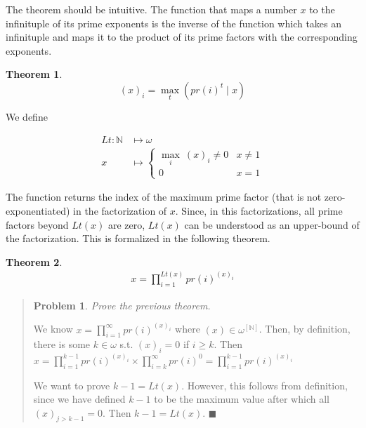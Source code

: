 \documentclass[a4paper, 12pt]{article}
\newtheorem{problem}{Problem}
\newtheorem{theorem}{Theorem}
\newtheorem{problem}{Problem}
\newtheorem{theorem}{Theorem}
\begin{document}
The theorem should be intuitive. The function that maps a number $x$ to the
infinituple of its prime exponents is the inverse of the function which takes an
infinituple and maps it to the product of its prime factors with the
corresponding exponents.

\begin{theorem}
    $$(x)_i = \max_{t} \left( pr(i)^{t} \mid x \right) $$
\end{theorem}

We define 

\begin{align*}
    Lt : \mathbb{N} &\mapsto \omega \\ 
    x &\mapsto \begin{cases}
        \max_{i} ~ (x)_i \neq 0 & x \neq 1 \\ 
        0 & x = 1
    \end{cases}
\end{align*}

The function returns the index of the maximum prime factor (that is not
zero-exponentiated) in the factorization of $x$. Since, in this factorizations,
all prime factors beyond $Lt(x)$ are zero, $Lt(x)$ can be understood as an
upper-bound of the factorization. This is formalized in the following theorem.

\begin{theorem}
    \begin{align*}
        x = \prod_{i=1}^{Lt(x)}  pr(i)^{(x)_i}
    \end{align*}
\end{theorem}


\small
\begin{quote}


\begin{problem}
    Prove the previous theorem.
\end{problem}

We know $x = \prod_{i=1}^{\infty} pr(i)^{(x)_i}  $ where $(x) \in
\omega^{[\mathbb{N}]}$. Then, by definition, there is some $k \in \omega$ s.t. $(x)_i = 0$
if $i \geq k$. Then $x = \prod_{i=1}^{k - 1} pr(i)^{(x)_i} \times \prod_{i=k}^{\infty}
pr(i)^{0} = \prod_{i=1}^{k-1} pr(i)^{(x)_i}     $

We want to prove $k - 1 = Lt(x)$. However, this follows from definition, since
we have defined $k - 1$ to be the maximum value after which all $(x)_{j > k -1}
= 0$. Then $k - 1 = Lt(x)$. $\blacksquare$


\end{quote}
\normalsize
\end{document}
